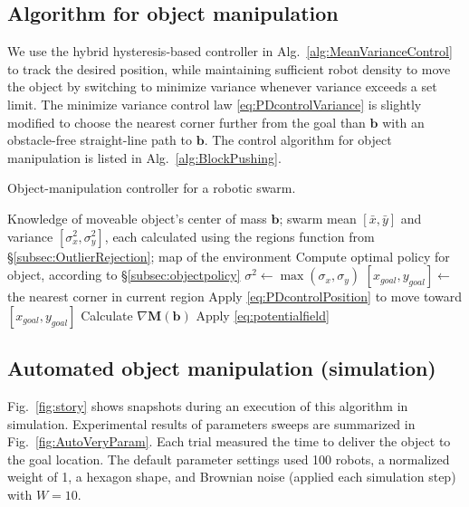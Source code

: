 \subsection{Algorithm for object manipulation}
 We use the hybrid hysteresis-based controller in Alg.~\ref{alg:MeanVarianceControl}  to track the desired position, while maintaining sufficient robot density to move the object by switching to minimize variance whenever variance exceeds a set limit. The minimize variance control law \eqref{eq:PDcontrolVariance} is slightly modified to choose the nearest corner further from the goal than $\mathbf{b}$ with an obstacle-free straight-line path to $\mathbf{b}$. 
The control algorithm  for object manipulation is listed in Alg.~\ref{alg:BlockPushing}. 


\begin{algorithm}
\caption{Object-manipulation controller for a robotic swarm.}\label{alg:BlockPushing}
\begin{algorithmic}[1]
\Require Knowledge of moveable object's center of mass $\mathbf{b}$; swarm mean $[\bar{x},\bar{y}]$ and variance $[\sigma_x^2, \sigma_y^2]$, each calculated using the regions function from \S \ref{subsec:OutlierRejection};  map of the environment
\State Compute optimal policy for object, according to \S \ref{subsec:objectpolicy}
\State $\sigma^2 \gets \max{(\sigma_x,\sigma_y)}$
\State $ [x_{goal}, y_{goal}] \gets $ the nearest corner in current region
\State Apply \eqref{eq:PDcontrolPosition} to move toward $[x_{goal}, y_{goal}]$
\EndWhile
\Else  
\State Calculate $\nabla \mathbf{M}(\mathbf{b})$  
\State Apply \eqref{eq:potentialfield}   
\EndIf
\EndWhile
\end{algorithmic}
\end{algorithm}


\subsection{Automated object manipulation (simulation)}
Fig.~\ref{fig:story} shows snapshots during an execution of this algorithm in simulation. 
Experimental results of parameters sweeps are summarized in Fig.~\ref{fig:AutoVeryParam}.  Each trial measured the time to deliver the object to the goal location.  The default parameter settings used 100 robots, a normalized weight of 1, a hexagon shape, and Brownian noise (applied each simulation step) with $W=10$.  

